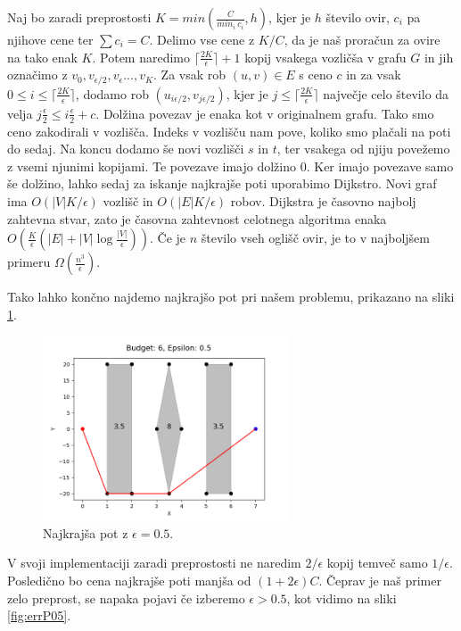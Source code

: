 \documentclass{article}
\begin{document}
Naj bo  zaradi preprostosti $K = min(\frac{C}{min_i \ c_i}, h)$, kjer je $h$ število ovir, $c_i$ pa njihove cene ter $\sum c_i = C$. Delimo vse cene z $K/C$, da je naš proračun za ovire na tako enak $K$. Potem naredimo $ \lceil{\frac{2K}{\epsilon}}\rceil + 1$  kopij vsakega vozličša v grafu $G$ in jih označimo z $v_0, v_{\epsilon/2}, v_{\epsilon}..., v_K$. Za vsak rob $(u, v) \in E$ s ceno $c$ in za vsak $0 \le i \le \lceil{\frac{2K}{\epsilon}}\rceil $, dodamo rob $(u_{i \epsilon/2}, v_{j \epsilon/2})$, kjer je $j\le\lceil{\frac{2K}{\epsilon}}\rceil$ največje celo število da velja $j\frac{\epsilon}{2}
 \le i \frac{\epsilon}{2} + c$. Dolžina povezav je enaka kot v originalnem grafu. Tako smo ceno zakodirali v vozlišča. Indeks v vozlišču nam pove, koliko smo plačali na poti do sedaj. Na koncu dodamo še novi vozlišči $s$ in $t$, ter vsakega od njiju povežemo z vsemi njunimi kopijami. Te povezave imajo dolžino $0$. Ker imajo povezave samo še dolžino, lahko sedaj za iskanje najkrajše poti uporabimo Dijkstro. Novi graf ima $O(|V|K/\epsilon)$ vozlišč in $O(|E|K/\epsilon)$ robov. Dijkstra  je  časovno najbolj zahtevna stvar, zato je časovna zahtevnost celotnega algoritma enaka $O(\frac{K}{\epsilon}(|E| + |V|\log\frac{|V|}{\epsilon}) )$. Če je $n$ število vseh oglišč ovir, je to v najboljšem primeru $\Omega(\frac{n^3}{\epsilon})$.

 Tako lahko končno najdemo najkrajšo pot pri našem problemu, prikazano na sliki \ref{fig:errP1}.

 \begin{figure}[h]
    \centering
    \includegraphics[width=0.65\textwidth]{errPath1.png}
    \caption{Najkrajša pot z $\epsilon = 0.5$.}
    \label{fig:errP1}
\end{figure}

V svoji implementaciji zaradi preprostosti ne naredim $2/\epsilon$ kopij temveč samo $1/\epsilon$. Posledično bo cena najkrajše poti manjša od $(1 + 2\epsilon)C$. Čeprav je naš primer zelo preprost, se napaka pojavi če izberemo $\epsilon > 0.5$, kot vidimo na sliki \ref{fig:errP05}.
\end{document}
